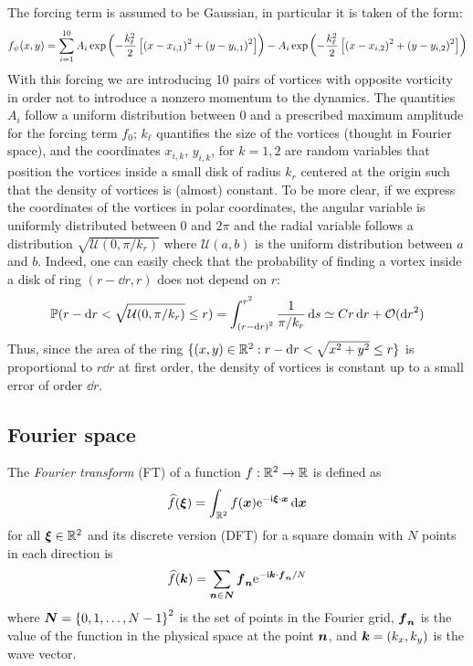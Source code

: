 \documentclass[../main.tex]{subfiles}
\begin{document}
The forcing term is assumed to be Gaussian, in particular it is taken of the form:
\begin{equation}
	f_\psi(x,y) = \sum_{i=1}^{10} A_i \operatorname{exp}\left(-\frac{k_\ell^2}{2}\left[{(x-x_{i,1})}^2 + {(y-y_{i,1})}^2\right]\right) - A_i\operatorname{exp}\left(-\frac{k_\ell^2}{2}\left[{(x-x_{i,2})}^2 + {(y-y_{i,2})}^2\right]\right)
\end{equation}
With this forcing we are introducing 10 pairs of vortices with opposite vorticity in order not to introduce a nonzero momentum to the dynamics. The quantities $A_i$ follow a uniform distribution between 0 and a prescribed maximum amplitude for the forcing term $f_0$; $k_\ell$ quantifies the size of the vortices (thought in Fourier space), and the coordinates $x_{i,k}$, $y_{i,k}$, for $k=1,2$ are random variables that position the vortices inside a small disk of radius $k_r$ centered at the origin such that the density of vortices is (almost) constant. To be more clear, if we express the coordinates of the vortices in polar coordinates, the angular variable is uniformly distributed between 0 and $2\pi$ and the radial variable follows a distribution $\sqrt{\mathcal{U}(0,\pi/k_r)}$ where $\mathcal{U}(a,b)$ is the uniform distribution between $a$ and $b$. Indeed, one can easily check that the probability of finding a vortex inside a disk of ring $(r-\dd{r},r)$ does not depend on $r$:
\begin{equation}
	\mathbb{P}(r-\dd{r} < \sqrt{\mathcal{U}(0,\pi/k_r)} \leq r) = \int_{{(r-\dd{r})}^2}^{r^2} \frac{1}{\pi/k_r} \dd{s} \simeq C r \dd{r} + \mathcal{O}(\dd{r}^2)
\end{equation}
Thus, since the area of the ring $\{(x,y) \in \mathbb{R}^2 : r-\dd{r} < \sqrt{x^2+y^2} \leq r\}$ is proportional to $r \dd{r}$ at first order, the density of vortices is constant up to a small error of order $\dd{r}$.
\subsection{Fourier space}
The \emph{Fourier transform} (FT) of a function $f:\mathbb{R}^2 \to \mathbb{R}$ is defined as
\begin{equation}
	\widehat{f}(\boldsymbol{\xi}) = \int_{\mathbb{R}^2} f(\boldsymbol{x}) \mathrm{e}^{-\mathrm{i} \boldsymbol{\xi} \cdot \boldsymbol{x}} \dd{\boldsymbol{x}}
\end{equation}
for all $\boldsymbol{\xi}\in\mathbb{R}^2$ and its discrete version (DFT) for a square domain with $N$ points in each direction is
\begin{equation}
	\widehat{f}(\boldsymbol{k}) = \sum_{\boldsymbol{n}\in\boldsymbol{N}} \boldsymbol{f}_{\boldsymbol{n}} \mathrm{e}^{-\mathrm{i} \boldsymbol{k} \cdot \boldsymbol{f}_{\boldsymbol{n}}/N}
\end{equation}
where $\boldsymbol{N} = {\{0,1,\ldots,N-1\}}^2$ is the set of points in the Fourier grid, $\boldsymbol{f}_{\boldsymbol{n}}$ is the value of the function in the physical space at the point $\boldsymbol{n}$, and $\boldsymbol{k} = (k_x,k_y)$ is the wave vector.
\end{document}
